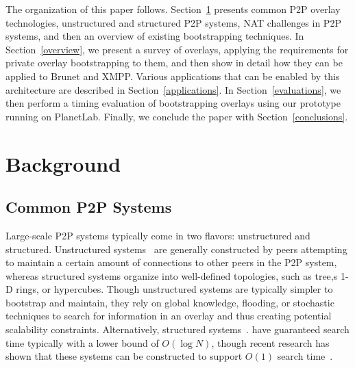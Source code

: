 \documentclass[conference]{IEEEtran}
\begin{document}
The organization of this paper follows.  Section~\ref{background} presents
common P2P overlay technologies, unstructured and structured P2P systems, NAT
challenges in P2P systems, and then an overview of existing bootstrapping
techniques.  In Section~\ref{overview}, we present a survey of overlays,
applying the requirements for private overlay bootstrapping to them, and then
show in detail how they can be applied to Brunet and XMPP.  Various
applications that can be enabled by this architecture are described in
Section~\ref{applications}.  In Section~\ref{evaluations}, we then perform a
timing evaluation of bootstrapping overlays using our prototype running on
PlanetLab.  Finally, we conclude the paper with Section~\ref{conclusions}.

\section{Background}
\label{background}
\subsection{Common P2P Systems}

Large-scale P2P systems typically come in two flavors:  unstructured and
structured.  Unstructured systems~\cite{gnutella, fasttrack} are generally
constructed by peers attempting to maintain a certain amount of connections to
other peers in the P2P system, whereas structured systems organize into
well-defined topologies, such as tree,s 1-D rings, or hypercubes.  Though
unstructured systems are typically simpler to bootstrap and maintain, they rely
on global knowledge, flooding, or stochastic techniques to search for
information in an overlay and thus creating potential scalability constraints.
Alternatively, structured systems~\cite{pastry, chord, symphony, kademlia,
can}.  have guaranteed search time typically with a lower bound of $O(\log N)$,
though recent research has shown that these systems can be constructed to
support $O(1)$ search time~\cite{beehive}.  
\end{document}
